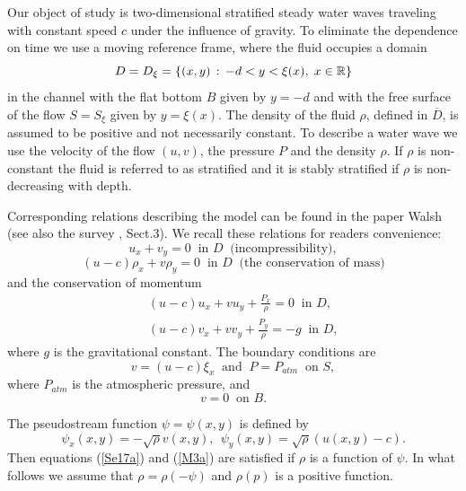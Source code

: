 \documentclass[a4paper,reqno,12pt]{amsart}
\theoremstyle{plain}
\theoremstyle{definition}
\numberwithin{equation}{section}
\begin{document}
Our object of study is two-dimensional stratified steady water waves  traveling
with constant speed $c$ under the influence of gravity. To eliminate the dependence on
time we use a moving reference frame, where the fluid occupies a  domain
 $$
D=D_\xi=\{(x,y)\,:\,-d<y<\xi(x),\;x\in\Bbb R\}
$$
in the channel with  the flat bottom $B$ given by $y=-d$ and with the free surface of
the flow $S=S_\xi$ given by $y=\xi(x)$. The density of the fluid $\rho$, defined
 in $\overline{D}$, is assumed to be positive and not necessarily constant.
 To describe a water wave we use the velocity of the flow $(u,v)$, the pressure $P$
 and the density $\rho$. If $\rho$ is non-constant the fluid is referred to as stratified and it is
stably stratified if $\rho$ is non-decreasing with depth.

 Corresponding relations describing the model can be found in the paper Walsh \cite{Wal} (see also the survey \cite{HSTW}, Sect.3). We recall these
 relations for readers convenience:
\begin{equation}\label{Se17a}
u_x+v_y=0\;\;\mbox{in $D$}\;\;\mbox{(incompressibility)},
\end{equation}
\begin{equation}\label{M3a}
(u-c)\rho_x+v\rho_y=0\;\;\mbox{in $D$}\;\;\mbox{(the conservation of mass)}
\end{equation}
and the conservation of momentum
\begin{eqnarray}\label{Se17aa}
&&(u-c)u_x+vu_y+\frac{P_x}{\rho}=0\;\;\mbox{in $D$},\nonumber\\
&&(u-c)v_x+vv_y+\frac{P_y}{\rho}=-g\;\;\mbox{in $D$},
\end{eqnarray}
where
 $g$ is the gravitational constant.
The boundary conditions are
\begin{equation}\label{Sep18a}
v=(u-c)\xi_x\;\;\mbox{and}\;\;P=P_{atm}\;\;\mbox{on $S$},
\end{equation}
where $P_{atm}$ is the atmospheric pressure, and
\begin{equation}\label{Sep18aa}
v=0\;\;\mbox{on $B$}.
\end{equation}

The pseudostream function $\psi=\psi(x,y)$ is defined by
$$
\psi_x(x,y)=-\sqrt{\rho}v(x,y),\,\;\psi_y(x,y)=\sqrt{\rho}(u(x,y)-c).
$$
Then  equations (\ref{Se17a}) and  (\ref{M3a}) are satisfied if $\rho$ is a function of $\psi$.
In what follows we assume that $\rho=\rho(-\psi)$ and $\rho(p)$ is a positive function.
\end{document}
